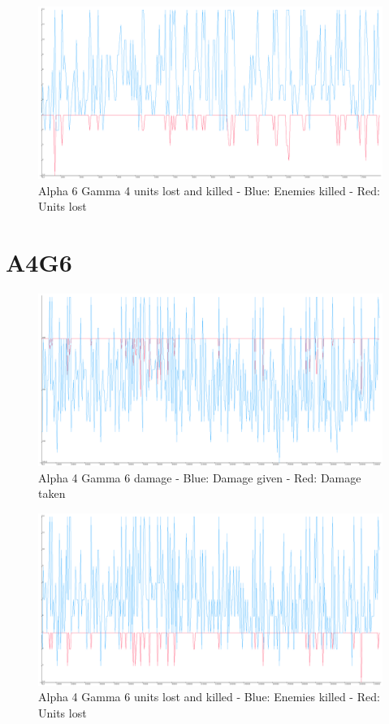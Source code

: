 \begin{figure}[H]
\includegraphics[angle=-90, scale=0.25]{Figures/learningrate/A6G4/units_lost_and_killed.png}
\caption{Alpha 6 Gamma 4 units lost and killed - Blue: Enemies killed - Red: Units lost}
\label{fig:app_a6g4_lak}
\end{figure}	


\section{A4G6}
\begin{figure}[H]
\includegraphics[angle=-90, scale=0.25]{Figures/learningrate/A4G6/damage.png}
\caption{Alpha 4 Gamma 6 damage - Blue: Damage given - Red: Damage taken}
\label{fig:app_a4g6_damage}
\end{figure}	

\begin{figure}[H]
\includegraphics[angle=-90, scale=0.25]{Figures/learningrate/A4G6/units_lost_and_units_killed.png}
\caption{Alpha 4 Gamma 6 units lost and killed - Blue: Enemies killed - Red: Units lost}
\label{fig:app_a4g6_lak}
\end{figure}	

